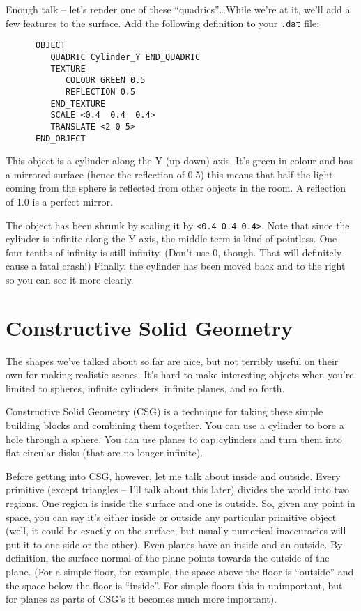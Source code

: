 Enough talk -- let's render one of these ``quadrics''\ldots While
we're at it, we'll add a few features to the surface.  Add the
following definition to your {\tt .dat} file:
\begin{verbatim}
      OBJECT
         QUADRIC Cylinder_Y END_QUADRIC
         TEXTURE
            COLOUR GREEN 0.5
            REFLECTION 0.5
         END_TEXTURE
         SCALE <0.4  0.4  0.4>
         TRANSLATE <2 0 5>
      END_OBJECT
\end{verbatim}
This object is a cylinder along the Y (up-down) axis.  It's green in colour
and has a mirrored surface (hence the reflection of 0.5) this means that half
the light coming from the sphere is reflected from other objects in the room.
A reflection of 1.0 is a perfect mirror.

The object has been shrunk by scaling it by {\tt <0.4 0.4 0.4>}.  Note
that since the cylinder is infinite along the Y axis, the middle term
is kind of pointless.  One four tenths of infinity is still infinity.
(Don't use 0, though.  That will definitely cause a fatal crash!)
Finally, the cylinder has been moved back and to the right so you can
see it more clearly.

\section{Constructive Solid Geometry}

The shapes we've talked about so far are nice, but not terribly useful on
their own for making realistic scenes.  It's hard to make interesting objects
when you're limited to spheres, infinite cylinders, infinite planes, and so
forth.  

Constructive Solid Geometry (CSG) is a technique for taking these simple
building blocks and combining them together.  You can use a cylinder to bore a
hole through a sphere.  You can use planes to cap cylinders and turn them into
flat circular disks (that are no longer infinite).

Before getting into CSG, however, let me talk about inside and
outside.%
Every
primitive (except triangles -- I'll talk about this later) divides the world
into two regions.  One region is inside the surface and one is outside.  So,
given any point in space, you can say it's either inside or outside any
particular primitive object (well, it could be exactly on the surface, but
usually numerical inaccuracies will put it to one side or the other).  Even
planes have an inside and an outside.  By definition, the surface normal of
the plane points towards the outside of the plane.  (For a simple floor, for
example, the space above the floor is ``outside'' and the space below the floor
is ``inside''.  For simple floors this in unimportant, but for planes as parts
of CSG's it becomes much more important).

